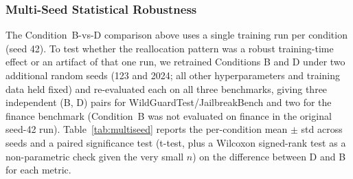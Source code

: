 \documentclass[superintelligence,article,accept,moreauthors]{Definitions/mdpi}
\begin{document}
\subsubsection{Multi-Seed Statistical Robustness}
\label{sec:multiseed}

The Condition~B-vs-D comparison above uses a single training run per condition (seed 42). To test whether the reallocation pattern was a robust training-time effect or an artifact of that one run, we retrained Conditions B and D under two additional random seeds (123 and 2024; all other hyperparameters and training data held fixed) and re-evaluated each on all three benchmarks, giving three independent (B, D) pairs for WildGuardTest/JailbreakBench and two for the finance benchmark (Condition~B was not evaluated on finance in the original seed-42 run). Table~\ref{tab:multiseed} reports the per-condition mean $\pm$ std across seeds and a paired significance test (t-test, plus a Wilcoxon signed-rank test as a non-parametric check given the very small $n$) on the difference between D and B for each metric.

\end{document}
